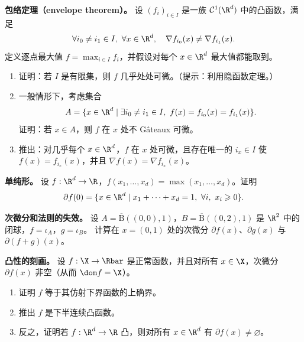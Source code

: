 
\begin{exercise}[原讲义 B.3 练习 18]
\label{exo:B3-18}
\textbf{包络定理（envelope theorem）。} 设 $(f_i)_{i\in I}$ 是一族 $\mathcal C^1(\R^d)$ 中的凸函数，满足
\begin{equation}
  \forall i_0\neq i_1\in I,\ \forall x\in\R^d,\quad\nabla f_{i_0}(x)\neq\nabla f_{i_1}(x).
  \label{eq:18}
\end{equation}
定义逐点最大值 $f=\max_{i\in I}f_i$，并假设对每个 $x\in\R^d$ 最大值都能取到。
\begin{enumerate}[label=\arabic*.]
  \item 证明：若 $I$ 是有限集，则 $f$ 几乎处处可微。（提示：利用隐函数定理。）
  \item 一般情形下，考虑集合
        \[
          A=\{x\in\R^d\mid\exists i_0\neq i_1\in I,\ f(x)=f_{i_0}(x)=f_{i_1}(x)\}.
        \]
        证明：若 $x\in A$，则 $f$ 在 $x$ 处不 Gâteaux 可微。
  \item 推出：对几乎每个 $x\in\R^d$，$f$ 在 $x$ 处可微，且存在唯一的 $i_x\in I$ 使 $f(x)=f_{i_x}(x)$，并且 $\nabla f(x)=\nabla f_{i_x}(x)$。
\end{enumerate}
\end{exercise}

\begin{exercise}[原讲义 B.3 练习 19]
\label{exo:B3-19}
\textbf{单纯形。} 设 $f:\R^d\to\R$，$f(x_1,\dots,x_d)=\max(x_1,\dots,x_d)$。证明
\[
  \partial f(0)=\{x\in\R^d\mid x_1+\dots+x_d=1,\ \forall i,\ x_i\geqslant0\}.
\]
\end{exercise}

\begin{exercise}[原讲义 B.3 练习 20]
\label{exo:B3-20}
\textbf{次微分和法则的失效。} 设 $A=\overline{\mathrm B}((0,0),1)$，$B=\overline{\mathrm B}((0,2),1)$ 是 $\R^2$ 中的闭球，$f=\iota_A$，$g=\iota_B$。
计算在 $x=(0,1)$ 处的次微分 $\partial f(x)$、$\partial g(x)$ 与 $\partial(f+g)(x)$。
\end{exercise}

\begin{exercise}[原讲义 B.3 练习 21]
\label{exo:B3-21}
\textbf{凸性的刻画。} 设 $f:\X\to\Rbar$ 是正常函数，并且对所有 $x\in\X$，次微分 $\partial f(x)$ 非空（从而 $\dom f=\X$）。
\begin{enumerate}[label=\arabic*.]
  \item 证明 $f$ 等于其仿射下界函数的上确界。
  \item 推出 $f$ 是下半连续凸函数。
  \item 反之，证明若 $f:\R^d\to\R$ 凸，则对所有 $x\in\R^d$ 有 $\partial f(x)\neq\varnothing$。
\end{enumerate}
\end{exercise}

